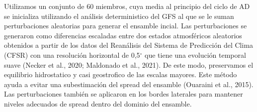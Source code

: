 \documentclass[12pt,oneside,a4paper]{reedthesis}
\begin{document}
Utilizamos un conjunto de 60 miembros, cuya media al principio del ciclo de AD se inicializa utilizando el análisis deterministico del GFS al que se le suman perturbaciones aleatorias para generar el ensamble incial. Las perturbaciones se generaron como diferencias escaladas entre dos estados atmosféricos aleatorios obtenidos a partir de los datos del Reanálisis del Sistema de Predicción del Clima (CFSR) con una resolución horizontal de 0,5\(^{\circ}\) que tiene una evolución temporal suave (Necker et al., 2020; Maldonado et al., 2021). De este modo, preservamos el equilibrio hidrostatico y casi geostrofico de las escalas mayores. Este método ayuda a evitar una subestimación del spread del ensamble (Ouaraini et al., 2015). Las perturbaciones también se aplicaron en los bordes laterales para mantener niveles adecuados de spread dentro del dominio del ensamble.
\end{document}

